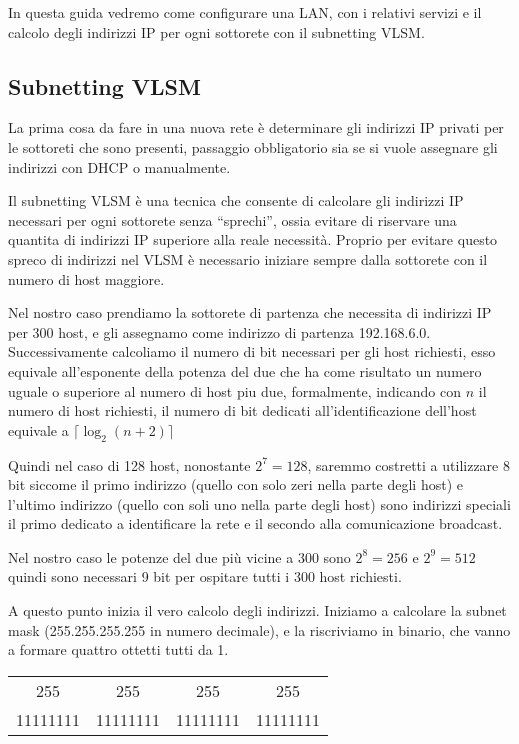 In questa guida vedremo come configurare una LAN, con i relativi servizi e il calcolo degli indirizzi IP per ogni sottorete con il subnetting VLSM.

\subsection{Subnetting VLSM}
La prima cosa da fare in una nuova rete è determinare gli indirizzi IP privati per le sottoreti che sono presenti, passaggio obbligatorio sia se si vuole assegnare gli indirizzi con DHCP o manualmente.

Il subnetting VLSM è una tecnica che consente di calcolare gli indirizzi IP necessari per ogni sottorete senza ``sprechi'', ossia evitare di riservare una quantita di indirizzi IP superiore alla reale necessità.
Proprio per evitare questo spreco di indirizzi nel VLSM è necessario iniziare sempre dalla sottorete con il numero di host maggiore.

Nel nostro caso prendiamo la sottorete di partenza che necessita di indirizzi IP per 300 host, e gli assegnamo come indirizzo di partenza 192.168.6.0. Successivamente calcoliamo il numero di bit necessari per gli host richiesti, esso equivale all’esponente della potenza del due che ha come risultato un numero uguale o superiore al numero di host piu due, formalmente, indicando con $n$ il numero di host richiesti, il numero di bit dedicati all'identificazione dell'host equivale a $\lceil \log_2 (n + 2) \rceil$

Quindi nel caso di 128 host, nonostante $2^7 = 128$, saremmo costretti a utilizzare 8 bit siccome il primo indirizzo (quello con solo zeri nella parte degli host) e l'ultimo indirizzo (quello con soli uno nella parte degli host) sono indirizzi speciali il primo dedicato a identificare la rete e il secondo alla comunicazione broadcast.

Nel nostro caso le potenze del due più vicine a $300$ sono $2^8 = 256$ e $2^9 = 512$ quindi sono necessari 9 bit per ospitare tutti i $300$ host richiesti.

A questo punto inizia il vero calcolo degli indirizzi. Iniziamo a calcolare la subnet mask (255.255.255.255 in numero decimale), e la riscriviamo in binario, che vanno a formare quattro ottetti tutti da 1.

\begin{center}
    \begin{tabular}{c@{.}c@{.}c@{.}c}
        255 & 255 & 255 & 255\\
        11111111 & 11111111 & 11111111 & 11111111
    \end{tabular}
\end{center}

